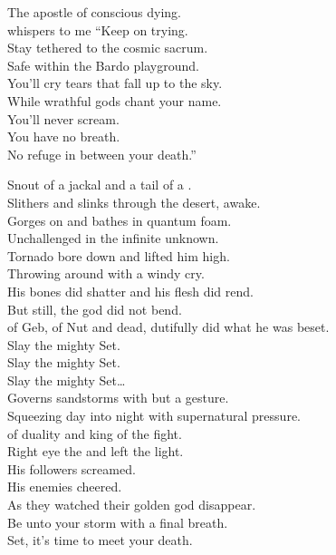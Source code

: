 The apostle of conscious dying. \\
whispers to me ``Keep on trying. \\
Stay tethered to the cosmic sacrum. \\
Safe within the Bardo playground. \\
You'll cry tears that fall up to the sky. \\
While wrathful gods chant your name. \\
You'll never scream. \\
You have no breath. \\
No refuge in between your death.'' \\



Snout of a jackal and a tail of a . \\
Slithers and slinks through the desert, awake. \\
Gorges on  and bathes in quantum foam. \\
Unchallenged in the infinite unknown. \\

Tornado bore down and lifted him high. \\
Throwing  around with a windy cry. \\
His bones did shatter and his flesh did rend. \\
But still, the god did not bend. \\

 of Geb, of Nut and dead, dutifully did what he was beset. \\

Slay the mighty Set. \\
Slay the mighty Set. \\
Slay the mighty Set… \\

Governs sandstorms with but a gesture. \\
Squeezing day into night with supernatural pressure. \\
 of duality and king of the fight. \\
Right eye the  and left the  light. \\
His followers screamed. \\
His enemies cheered. \\
As they watched their golden god disappear. \\
Be unto your storm with a final breath. \\
Set, it's time to meet your death. \\

